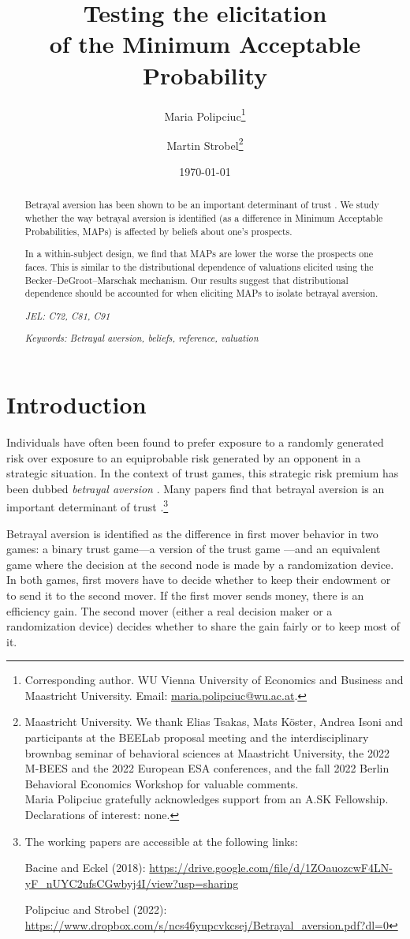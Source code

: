 \documentclass[pdftex,12pt, a4paper]{article}
\title{Testing the elicitation \\ of the Minimum Acceptable Probability}
\author{Maria Polipciuc\thanks{Corresponding author. WU Vienna University of Economics and Business and Maastricht University. Email: \url{maria.polipciuc@wu.ac.at}.} \and Martin Strobel\thanks{Maastricht University. We thank Elias Tsakas, Mats K\"{o}ster, Andrea Isoni and participants at the BEELab proposal meeting and the interdisciplinary brownbag seminar of behavioral sciences at Maastricht University, the 2022 M-BEES and the 2022 European ESA conferences, and the fall 2022 Berlin Behavioral Economics Workshop for valuable comments. \\
Maria Polipciuc gratefully acknowledges support from an A.SK Fellowship.\\ Declarations of interest: none.}}
\date{\today	\vspace{1cm}}
\begin{document}
\begin{titlepage}
\clearpage
\maketitle
\thispagestyle{empty}


\begin{abstract}
Betrayal aversion has been shown to be an important determinant of trust \citep{Bohnet2004}.
We study whether the way betrayal aversion is identified (as a difference in Minimum Acceptable Probabilities, MAPs) is affected by beliefs about one’s prospects.

In a within-subject design, we find that MAPs are lower the worse the prospects one faces.
This is similar to the distributional dependence of valuations elicited using the Becker–DeGroot–Marschak mechanism.
Our results suggest that distributional dependence should be accounted for when eliciting MAPs to isolate betrayal aversion.

\noindent \textit{JEL: C72, C81, C91}

\noindent  \textit{Keywords: Betrayal aversion, beliefs, reference, valuation}

\end{abstract}
\end{titlepage}


\section{Introduction}\label{sec:intro}
Individuals have often been found to prefer exposure to a randomly generated risk over exposure to an equiprobable risk generated by an opponent in a strategic situation.
In the context of trust games, this strategic risk premium has been dubbed \textit{betrayal aversion} \citep{Bohnet2004}.
Many papers find that betrayal aversion is an important determinant of trust \citep[][the working papers of Bacine and Eckel, 2018, and Polipciuc and Strobel, 2022]{Bohnet2004, Aimone2015, Fairley2016, Quercia2016, Butler2018}.\footnote{
The working papers are accessible at the following links:

Bacine and Eckel (2018): \url{https://drive.google.com/file/d/1ZOauozcwF4LN-yF_nUYC2ufsCGwbyj4I/view?usp=sharing}

Polipciuc and Strobel (2022): \url{https://www.dropbox.com/s/ncs46yupcvkcsej/Betrayal_aversion.pdf?dl=0}
}

Betrayal aversion is identified as the difference in first mover behavior in two games: a binary trust game---a version of the trust game \citep{Berg1995}---and an equivalent game where the decision at the second node is made by a randomization device.
In both games, first movers have to decide whether to keep their endowment or to send it to the second mover.
If the first mover sends money, there is an efficiency gain.
The second mover (either a real decision maker or a randomization device) decides whether to share the gain fairly or to keep most of it.
\end{document}
